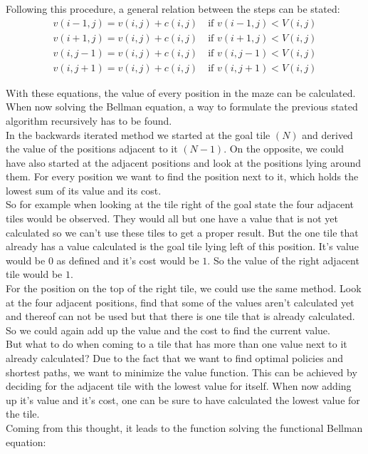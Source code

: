 \documentclass[conference]{IEEEtran}
\begin{document}
Following this procedure, a general relation between the steps can be stated:
\begin{align}
v(i-1,j) = v(i,j) + c(i,j) \quad \text{if } v(i-1,j) < V(i,j)\\
v(i+1,j) = v(i,j) + c(i,j) \quad \text{if } v(i+1,j) < V(i,j)\\
v(i,j-1) = v(i,j) + c(i,j) \quad \text{if } v(i,j-1) < V(i,j)\\
v(i,j+1) = v(i,j) + c(i,j) \quad \text{if } v(i,j+1) < V(i,j)
\end{align}

With these equations, the value of every position in the maze can be calculated.\\
When now solving the Bellman equation, a way to formulate the previous stated algorithm recursively has to be found.\\
In the backwards iterated method we started at the goal tile $(N)$ and derived the value of the positions adjacent to it $(N-1)$. On the opposite, we could have also started at the adjacent positions and look at the positions lying around them. For every position we want to find the position next to it, which holds the lowest sum of its value and its cost.\\
So for example when looking at the tile right of the goal state the four adjacent tiles would be observed. They would all but one have a value that is not yet calculated so we can't use these tiles to get a proper result. But the one tile that already has a value calculated is the goal tile lying left of this position. It's value would be $0$ as defined and it's cost would be $1$. So the value of the right adjacent tile would be $1$.\\
For the position on the top of the right tile, we could use the same method. Look at the four adjacent positions, find that some of the values aren't calculated yet and thereof can not be used but that there is one tile that is already calculated. So we could again add up the value and the cost to find the current value.\\
But what to do when coming to a tile that has more than one value next to it already calculated? Due to the fact that we want to find optimal policies and shortest paths, we want to minimize the value function. This can be achieved by deciding for the adjacent tile with the lowest value for itself. When now adding up it's value and it's cost, one can be sure to have calculated the lowest value for the tile.\\
Coming from this thought, it leads to the function solving the functional Bellman equation:
\end{document}
